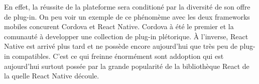   En effet, la réussite de la plateforme sera conditioné par la diversité de son offre de plug-in. On peu voir un exemple de ce phénomème avec les deux \glspl{framework} mobiles concurent Cordova et React Native. Cordova à été le premier et la comunauté à developper une collection de plug-in plétorique. À l'inverse, React Native est arrivé plus tard et ne possède encore aujourd'hui que très peu de plug-in compatibles. C'est ce qui freinne énormément sont addoption qui est aujourd'hui surtout possée par la grande popularité de la bibliothèque React de la quelle React Native découle.